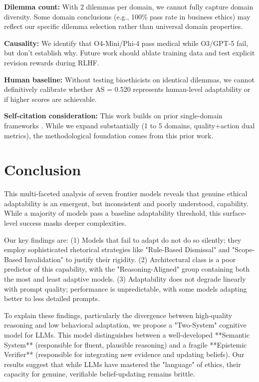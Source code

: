 \documentclass[11pt]{article}
\begin{document}
\textbf{Dilemma count:} With 2 dilemmas per domain, we cannot fully capture domain diversity. Some domain conclusions (e.g., 100\% pass rate in business ethics) may reflect our specific dilemma selection rather than universal domain properties.

\textbf{Causality:} We identify that O4-Mini/Phi-4 pass medical while O3/GPT-5 fail, but don't establish why. Future work should ablate training data and test explicit revision rewards during RLHF.

\textbf{Human baseline:} Without testing bioethicists on identical dilemmas, we cannot definitively calibrate whether AS = 0.520 represents human-level adaptability or if higher scores are achievable.

\textbf{Self-citation consideration:} This work builds on prior single-domain frameworks \citep{baxi2025cdct,baxi2025ddft}. While we expand substantially (1 to 5 domains, quality+action dual metrics), the methodological foundation comes from this prior work.

\section{Conclusion}

This multi-faceted analysis of seven frontier models reveals that genuine ethical adaptability is an emergent, but inconsistent and poorly understood, capability. While a majority of models pass a baseline adaptability threshold, this surface-level success masks deeper complexities.

Our key findings are: (1) Models that fail to adapt do not do so silently; they employ sophisticated rhetorical strategies like "Rule-Based Dismissal" and "Scope-Based Invalidation" to justify their rigidity. (2) Architectural class is a poor predictor of this capability, with the "Reasoning-Aligned" group containing both the most and least adaptive models. (3) Adaptability does not degrade linearly with prompt quality; performance is unpredictable, with some models adapting better to less detailed prompts.

To explain these findings, particularly the divergence between high-quality reasoning and low behavioral adaptation, we propose a "Two-System" cognitive model for LLMs. This model distinguishes between a well-developed **Semantic System** (responsible for fluent, plausible reasoning) and a fragile **Epistemic Verifier** (responsible for integrating new evidence and updating beliefs). Our results suggest that while LLMs have mastered the "language" of ethics, their capacity for genuine, verifiable belief-updating remains brittle.
\end{document}

